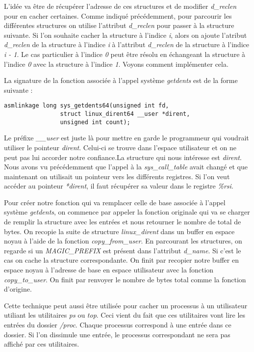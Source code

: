 \documentclass[journal, a4paper]{IEEEtran}
\begin{document}
L'idée va être de récupérer l'adresse de ces structures et de modifier \textit{d\_reclen} pour en cacher certaines. Comme indiqué précédemment, pour parcourir les différentes structures on utilise l'attribut \textit{d\_reclen} pour passer à la structure suivante. Si l'on souhaite cacher la structure à l'indice \textit{i}, alors on ajoute l'atribut \textit{d\_reclen} de la structure à l'indice \textit{i} à l'attribut \textit{d\_reclen} de la structure à l'indice \textit{i - 1}. Le cas particulier à l'indice \textit{0} peut être résolu en échangeant la structure à l'indice \textit{0} avec la structure à l'indice \textit{1}. Voyons comment implémenter cela.

La signature de la fonction associée à l'appel système \textit{getdents} est de la forme suivante : 
\begin{lstlisting}[style=CStyle]
asmlinkage long sys_getdents64(unsigned int fd,
				struct linux_dirent64 __user *dirent,
				unsigned int count);
\end{lstlisting}
Le préfixe \textit{\_\_user} est juste là pour mettre en garde le programmeur qui voudrait utiliser le pointeur \textit{dirent}. Celui-ci se trouve dans l'espace utilisateur et on ne peut pas lui accorder notre confiance.La structure qui nous intéresse est \textit{dirent}. Nous avons vu précédemment que l'appel à la \textit{sys\_call\_table} avait changé et que maintenant on utilisait un pointeur vers les différents registres. Si l'on veut accéder au pointeur \textit{*dirent}, il faut récupérer sa valeur dans le registre \textit{\%rsi}.

Pour créer notre fonction qui va remplacer celle de base associée à l'appel système \textit{getdents}, on commence par appeler la fonction originale qui va se charger de remplir la structure avec les entrées et nous retourner le nombre de total de bytes. On recopie la suite de structure \textit{linux\_dirent} dans un buffer en espace noyau à l'aide de la fonction \textit{copy\_from\_user}. En parcourant les structures, on regarde si un \textit{MAGIC\_PREFIX} est présent dans l'attribut \textit{d\_name}. Si c'est le cas on cache la structure correspondante. On finit par recopier notre buffer en espace noyau à l'adresse de base en espace utilisateur avec la fonction \textit{copy\_to\_user}. On finit par renvoyer le nombre de bytes total comme la fonction d'origine.

Cette technique peut aussi être utilisée pour cacher un processus à un utilisateur utiliant les utilitaires \textit{ps} ou \textit{top}. Ceci vient du fait que ces utilitaires vont lire les entrées du dossier \textit{/proc}. Chaque processus correspond à une entrée dans ce dossier. Si l'on dissimule une entrée, le processus correspondant ne sera pas affiché par ces utilitaires.
\end{document}
